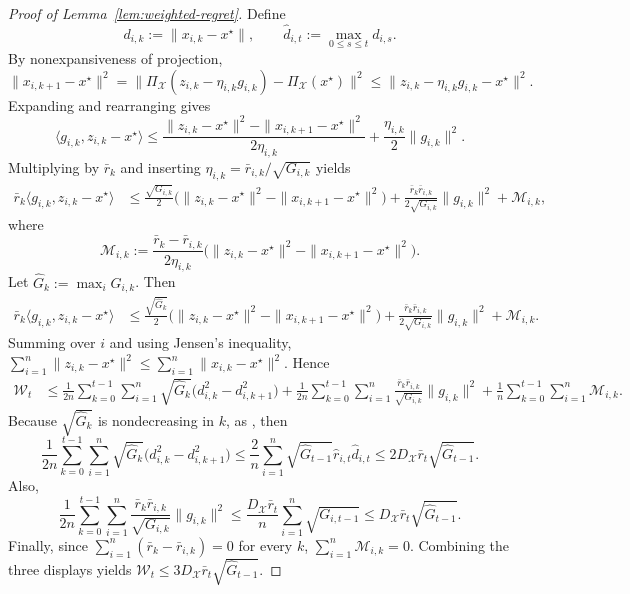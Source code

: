 \documentclass[runningheads]{llncs}
\begin{document}
\begin{proof}[Proof of Lemma~\ref{lem:weighted-regret}]
Define
\[
d_{i,k}:=\|x_{i,k}-x^\star\|,
\qquad
\hat d_{i,t}:=\max_{0\le s\le t} d_{i,s}.
\]
By nonexpansiveness of projection,
\[
\|x_{i,k+1}-x^\star\|^2
=
\|\Pi_{\mathcal{X}}(z_{i,k}-\eta_{i,k}g_{i,k})-\Pi_{\mathcal{X}}(x^\star)\|^2
\le
\|z_{i,k}-\eta_{i,k}g_{i,k}-x^\star\|^2.
\]
Expanding and rearranging gives
\begin{equation}\label{eq:one-step-inner-appendix}
\langle g_{i,k},z_{i,k}-x^\star\rangle
\le
\frac{\|z_{i,k}-x^\star\|^2-\|x_{i,k+1}-x^\star\|^2}{2\eta_{i,k}}
+
\frac{\eta_{i,k}}{2}\|g_{i,k}\|^2.
\end{equation}
Multiplying by \(\bar r_k\) and inserting
\(\eta_{i,k}=\bar r_{i,k}/\sqrt{G_{i,k}}\) yields
\begin{align*}
\bar r_k\langle g_{i,k},z_{i,k}-x^\star\rangle
&\le
\frac{\sqrt{G_{i,k}}}{2}\bigl(\|z_{i,k}-x^\star\|^2-\|x_{i,k+1}-x^\star\|^2\bigr)
+\frac{\bar r_k\bar r_{i,k}}{2\sqrt{G_{i,k}}}\|g_{i,k}\|^2
+\mathcal M_{i,k},
\end{align*}
where
\[
\mathcal M_{i,k}
:=
\frac{\bar r_k-\bar r_{i,k}}{2\eta_{i,k}}
\bigl(\|z_{i,k}-x^\star\|^2-\|x_{i,k+1}-x^\star\|^2\bigr).
\]
Let \(\hat G_k:=\max_i G_{i,k}\). Then
\begin{align*}
\bar r_k\langle g_{i,k},z_{i,k}-x^\star\rangle
&\le
\frac{\sqrt{\hat G_k}}{2}\bigl(\|z_{i,k}-x^\star\|^2-\|x_{i,k+1}-x^\star\|^2\bigr)
+\frac{\bar r_k\bar r_{i,k}}{2\sqrt{G_{i,k}}}\|g_{i,k}\|^2
+\mathcal M_{i,k}.
\end{align*}
Summing over \(i\) and using Jensen's inequality,
$
\sum_{i=1}^{n}\|z_{i,k}-x^\star\|^2
\le
\sum_{i=1}^{n}\|x_{i,k}-x^\star\|^2.
$
Hence
\begin{align*}
\mathcal W_t
&\le
\frac{1}{2n}\sum_{k=0}^{t-1}\sum_{i=1}^{n}
\sqrt{\hat G_k}\bigl(d_{i,k}^2-d_{i,k+1}^2\bigr)
+
\frac{1}{2n}\sum_{k=0}^{t-1}\sum_{i=1}^{n}
\frac{\bar r_k\bar r_{i,k}}{\sqrt{G_{i,k}}}\|g_{i,k}\|^2
+
\frac{1}{n}\sum_{k=0}^{t-1}\sum_{i=1}^{n}\mathcal M_{i,k}.
\end{align*}
Because \(\sqrt{\hat G_k}\) is nondecreasing in \(k\), as \cite[Lemma 1]{ivgi2023dog}, then
\[
\frac{1}{2n}\sum_{k=0}^{t-1}\sum_{i=1}^{n}
\sqrt{\hat G_k}\bigl(d_{i,k}^2-d_{i,k+1}^2\bigr)
\le
\frac{2}{n}\sum_{i=1}^{n}\sqrt{\hat G_{t-1}}\hat r_{i,t}\hat d_{i,t}
\le
2D_{\mathcal{X}}\bar r_t\sqrt{\hat G_{t-1}}.
\]
Also,
\[
\frac{1}{2n}\sum_{k=0}^{t-1}\sum_{i=1}^{n}
\frac{\bar r_k\bar r_{i,k}}{\sqrt{G_{i,k}}}\|g_{i,k}\|^2
\le
\frac{D_{\mathcal{X}}\bar r_t}{n}\sum_{i=1}^{n}\sqrt{G_{i,t-1}}
\le
D_{\mathcal{X}}\bar r_t\sqrt{\hat G_{t-1}}.
\]
Finally, since \(\sum_{i=1}^{n}(\bar r_k-\bar r_{i,k})=0\) for every \(k\),
$
\sum_{i=1}^{n}\mathcal M_{i,k}=0.
$
Combining the three displays yields
$
\mathcal W_t\le 3D_{\mathcal{X}}\bar r_t\sqrt{\hat G_{t-1}}.
$
\end{proof}
\end{document}
